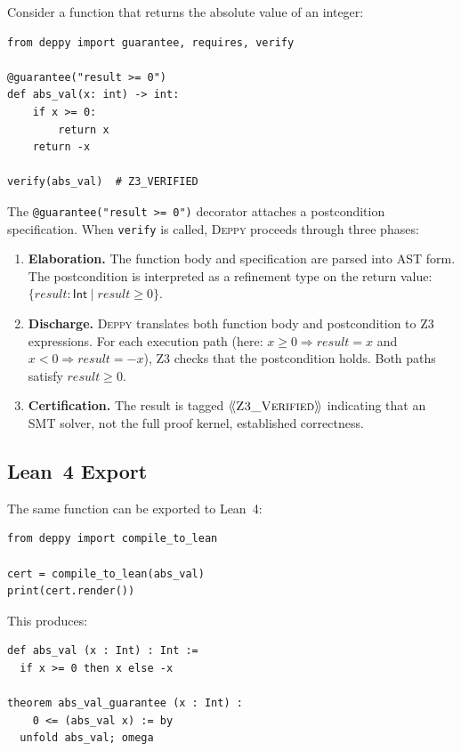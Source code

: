 \documentclass[acmsmall,nonacm,screen]{acmart}
\newcommand{\deppy}{\textsc{Deppy}}
\newcommand{\syntype}[1]{\ensuremath{\mathsf{#1}}}
\newcommand{\pyint}{\syntype{Int}}
\newcommand{\reftype}[3]{\{#1 : #2 \mid #3\}}
\newcommand{\trustlevel}[1]{\ensuremath{\langle\!\langle \text{#1} \rangle\!\rangle}}
\begin{document}
Consider a function that returns the absolute value of an integer:

\begin{lstlisting}[language=deppy]
from deppy import guarantee, requires, verify

@guarantee("result >= 0")
def abs_val(x: int) -> int:
    if x >= 0:
        return x
    return -x

verify(abs_val)  # Z3_VERIFIED
\end{lstlisting}

The \texttt{@guarantee("result >= 0")} decorator attaches a
postcondition specification.  When \texttt{verify} is called,
\deppy{} proceeds through three phases:

\begin{enumerate}
\item \textbf{Elaboration.}  The function body and specification are
  parsed into AST form.  The postcondition is interpreted as a
  refinement type on the return value:
  $\reftype{\mathit{result}}{\pyint}{\mathit{result} \ge 0}$.

\item \textbf{Discharge.}  \deppy{} translates both function body and
  postcondition to Z3 expressions.  For each execution path (here:
  $x \ge 0 \Rightarrow \mathit{result} = x$ and
  $x < 0 \Rightarrow \mathit{result} = -x$), Z3 checks that the
  postcondition holds.  Both paths satisfy $\mathit{result} \ge 0$.

\item \textbf{Certification.}  The result is tagged
  \trustlevel{\textsc{Z3\_Verified}} indicating that an SMT solver,
  not the full proof kernel, established correctness.
\end{enumerate}

\subsection{Lean~4 Export}

The same function can be exported to Lean~4:

\begin{lstlisting}[language=deppy]
from deppy import compile_to_lean

cert = compile_to_lean(abs_val)
print(cert.render())
\end{lstlisting}

This produces:

\begin{lstlisting}[language=lean4]
def abs_val (x : Int) : Int :=
  if x >= 0 then x else -x

theorem abs_val_guarantee (x : Int) :
    0 <= (abs_val x) := by
  unfold abs_val; omega
\end{lstlisting}
\end{document}
